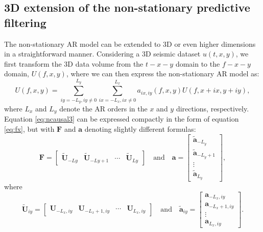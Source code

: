 \subsection{3D extension of the non-stationary predictive filtering}
The non-stationary AR model can be extended to 3D or even higher dimensions in a straightforward manner. Considering a 3D seismic dataset $u(t,x,y)$, we first transform the 3D data volume from the $t-x-y$ domain to the $f-x-y$ domain, $U(f,x,y)$, where we can then express the non-stationary AR model as:
\begin{equation}
\label{eq:ncausal3}
U(f,x,y)=\sum_{iy=-L_y,iy\ne 0}^{L_y}\sum_{ix=-L_x,ix\ne 0}^{L_x}a_{ix,iy}(f,x,y)U(f,x+ix,y+iy),
\end{equation}
where $L_x$ and $L_y$ denote the AR orders in the $x$ and $y$ directions, respectively. 
Equation \ref{eq:ncausal3} can be expressed compactly in the form of equation \ref{eq:fx}, but with $\mathbf{F}$ and $\mathbf{a}$ denoting slightly different formulas:
\begin{equation}
\label{eq:fx3d}
\mathbf{F}=\left[\begin{array}{cccc}
\tilde{\mathbf{U}}_{-Ly} &\tilde{\mathbf{U}}_{-Ly+1}&\cdots&\tilde{\mathbf{U}}_{Ly}
\end{array}\right] \quad \text{and}\quad \mathbf{a}=\left[\begin{array}{c}
\tilde{\mathbf{a}}_{-L_y}\\
\tilde{\mathbf{a}}_{-L_y+1}\\
\vdots\\
\tilde{\mathbf{a}}_{L_y}
\end{array}\right],
\end{equation}
where
\begin{equation}
\label{eq:fx3d2}
\tilde{\mathbf{U}}_{iy}=\left[\begin{array}{cccc}
\mathbf{U}_{-{L_x},iy} &\mathbf{U}_{-L_x+1,iy}&\cdots&\mathbf{U}_{L_x,iy}
\end{array}\right] \quad \text{and}\quad \tilde{\mathbf{a}}_{iy}=\left[\begin{array}{c}
\mathbf{a}_{-L_x,iy}\\
\mathbf{a}_{-L_x+1,iy}\\
\vdots\\
\mathbf{a}_{L_x,iy}
\end{array}\right].
\end{equation}

